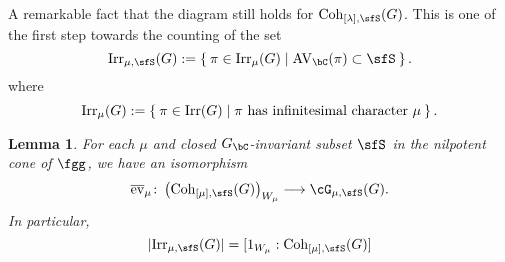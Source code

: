 \documentclass[12pt,a4paper]{amsart}
\newcommand{\AVC}{\mathrm{AV}_\bC}
\def\abs#1{\left|{#1}\right|}
\numberwithin{equation}{section}
\newtheorem{lem}[thm]{Lemma}
\newtheorem{eg}[thm]{Example}
\theoremstyle{remark}
\def\Irr{\mathrm{Irr}}
\def\Gc{G_\bC}
\def\Coh{\mathrm{Coh}}
\def\bev#1{\overline{\mathrm{ev}}_{#1}}
\begin{document}

A remarkable fact that the diagram  still holds for
$\Coh_{[\lambda],\sfS}(G)$. This is one of the first step towards the counting
of the set
\[
  \Irr_{\mu,\sfS}(G):=\Set{\pi \in \Irr_{\mu}(G)| \text{$\AVC(\pi)\subset \sfS$} }.
\]
where
\[
  \Irr_{\mu}(G):=\Set{\pi \in \Irr(G)| \pi \text{ has infinitesimal character
    }\mu}.
\]


\begin{lem}
  For each $\mu$ and closed $\Gc$-invariant subset $\sfS$ in the nilpotent cone
  of $\fgg$, we have an isomorphism
  \[
    \bev{\mu}\colon \left(\Coh_{[\mu],\sfS}(G)\right)_{W_{\mu}} \longrightarrow \Grt_{\mu,\sfS}(G).
  \]
  In particular,
  \[
    \abs{\Irr_{\mu,\sfS}(G)} = [1_{W_{\mu}}:\Coh_{[\mu],\sfS}(G)]
  \]
\end{lem}
\end{document}
